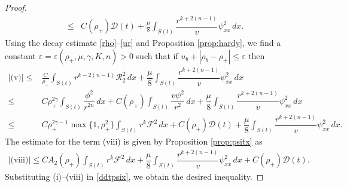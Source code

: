 \documentclass[a4paper,12pt,draft]{article}
\theoremstyle{remark}
\def\ep{\varepsilon}
\def\mD{\mathcal{D}}
\def\mF{\mathcal{F}}
\def\mR{\mathcal{R}}
\begin{document}
\begin{proof}
\begin{align*}
        \le&  C(\rho_{+}) \mD(t) + \frac{\mu}{8} \int_{S(t)}\!\!\!\dfrac{r^{k+2(n-1)}}{v} \psi_{xx}^2 \, dx.
    \end{align*}
    Using the decay estimate \eqref{rho}--\eqref{ur} and Proposition \ref{prop:hardy}, we find a constant $\ep=\ep(\rho_{+},\mu,\gamma,K,n)>0$ such that if $u_b+ |\rho_b-\rho_{+}| \le \ep$ then
    \begin{align*}
        |\textrm{(v)}| \le& \frac{C}{\rho_{+}} \int_{S(t)}\!\! r^{k-2(n-1)}\mR_2^2 \, dx + \dfrac{\mu}{8} \int_{S(t)}\!\! \dfrac{r^{k+2(n-1)}}{v} \psi_{xx}^2\, dx \\
        \le& C \rho_{+}^{2\gamma} \int_{S(t)} \dfrac{\phi^2}{r^{2n}}\, dx + C(\rho_{+}) \int_{S(t)} \dfrac{v\psi^2}{r^2} \, d x +  \dfrac{\mu}{8} \int_{S(t)}\!\! \dfrac{r^{k+2(n-1)}}{v} \psi_{xx}^2\, dx\\
        \le & C \rho_{+}^{2\gamma-1} \max\{1,\rho_{+}^2\} \int_{S(t)} r^k \mF^2 \, dx + C(\rho_{+}) \mD(t) +  \dfrac{\mu}{8} \int_{S(t)}\!\! \dfrac{r^{k+2(n-1)}}{v} \psi_{xx}^2\, dx.
    \end{align*}
    The estimate for the term \textrm{(viii)} is given by Proposition \ref{prop:psitx} as
    \begin{align*}
        |\textrm{(viii)}| \le C A_2(\rho_{+})\int_{S(t)}\!\! r^k \mF^2\, dx + \dfrac{\mu}{8} \int_{S(t)}\!\!\!\! \dfrac{r^{k+2(n-1)}}{v}\psi_{xx}^2\, dx + C(\rho_{+})\mD(t).
    \end{align*}
    Substituting \textrm{(i)}--\textrm{(viii)} in \eqref{ddtpsix}, we obtain the desired inequality.
\end{proof}
\end{document}
